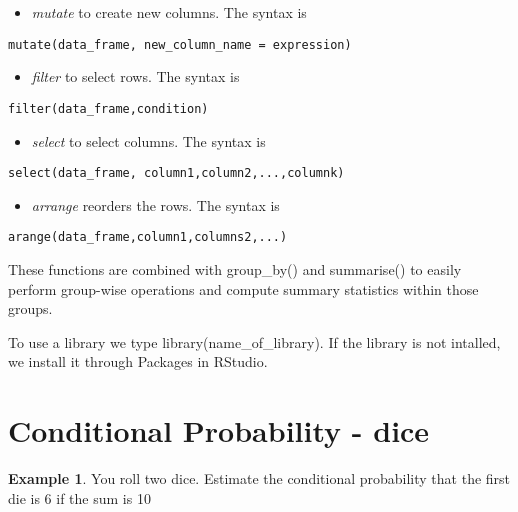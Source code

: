 \documentclass[
]{book}
\providecommand{\tightlist}{%
  \setlength{\itemsep}{0pt}\setlength{\parskip}{0pt}}
\theoremstyle{definition}
\theoremstyle{definition}
\newtheorem{example}{Example}[chapter]
\theoremstyle{definition}
\theoremstyle{definition}
\theoremstyle{remark}
\begin{document}
\begin{itemize}
\tightlist
\item
  \emph{mutate} to create new columns. The syntax is
\end{itemize}

\begin{verbatim}
mutate(data_frame, new_column_name = expression)
\end{verbatim}

\begin{itemize}
\tightlist
\item
  \emph{filter} to select rows. The syntax is
\end{itemize}

\begin{verbatim}
filter(data_frame,condition)
\end{verbatim}

\begin{itemize}
\tightlist
\item
  \emph{select} to select columns. The syntax is
\end{itemize}

\begin{verbatim}
select(data_frame, column1,column2,...,columnk)
\end{verbatim}

\begin{itemize}
\tightlist
\item
  \emph{arrange} reorders the rows. The syntax is
\end{itemize}

\begin{verbatim}
arange(data_frame,column1,columns2,...)
\end{verbatim}

These functions are combined with group\_by() and summarise() to easily perform group-wise operations and compute summary statistics within those groups.

To use a library we type library(name\_of\_library). If the library is not intalled, we install it through Packages in RStudio.

\hypertarget{conditional-probability-dice}{%
\section{Conditional Probability - dice}\label{conditional-probability-dice}}

\begin{example}
You roll two dice. Estimate the conditional probability that the first die is 6 if the sum is 10
\end{example}
\end{document}
